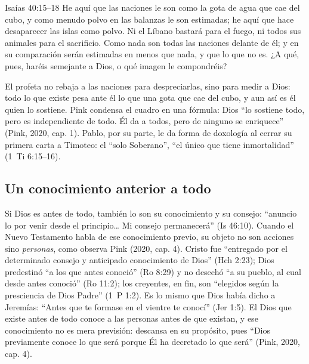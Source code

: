 \begin{verso}{Isaías 40:15–18}
He aquí que las naciones le son como la gota de agua que cae del cubo, y como menudo polvo en las balanzas le son estimadas; he aquí que hace desaparecer las islas como polvo. Ni el Líbano bastará para el fuego, ni todos sus animales para el sacrificio. Como nada son todas las naciones delante de él; y en su comparación serán estimadas en menos que nada, y que lo que no es. ¿A qué, pues, haréis semejante a Dios, o qué imagen le compondréis?
\end{verso}

El profeta no rebaja a las naciones para despreciarlas, sino para medir a Dios: todo lo que existe pesa ante él lo que una gota que cae del cubo, y aun así es él quien lo sostiene. Pink condensa el cuadro en una fórmula: Dios ``lo sostiene todo, pero es independiente de todo. Él da a todos, pero de ninguno se enriquece'' (Pink, 2020, cap. 1). Pablo, por su parte, le da forma de doxología al cerrar su primera carta a Timoteo: el ``solo Soberano'', ``el único que tiene inmortalidad'' (1~Ti 6:15--16).


\subsection{Un conocimiento anterior a todo}

Si Dios es antes de todo, también lo son su conocimiento y su consejo: ``anuncio lo por venir desde el principio\ldots{} Mi consejo permanecerá'' (Is 46:10). Cuando el Nuevo Testamento habla de ese conocimiento previo, su objeto no son acciones sino \emph{personas}, como observa Pink (2020, cap. 4). Cristo fue ``entregado por el determinado consejo y anticipado conocimiento de Dios'' (Hch 2:23); Dios predestinó ``a los que antes conoció'' (Ro 8:29) y no desechó ``a su pueblo, al cual desde antes conoció'' (Ro 11:2); los creyentes, en fin, son ``elegidos según la presciencia de Dios Padre'' (1~P 1:2). Es lo mismo que Dios había dicho a Jeremías: ``Antes que te formase en el vientre te conocí'' (Jer 1:5). El Dios que existe antes de todo conoce a las personas antes de que existan, y ese conocimiento no es mera previsión: descansa en su propósito, pues ``Dios previamente conoce lo que será porque Él ha decretado lo que será'' (Pink, 2020, cap. 4).

